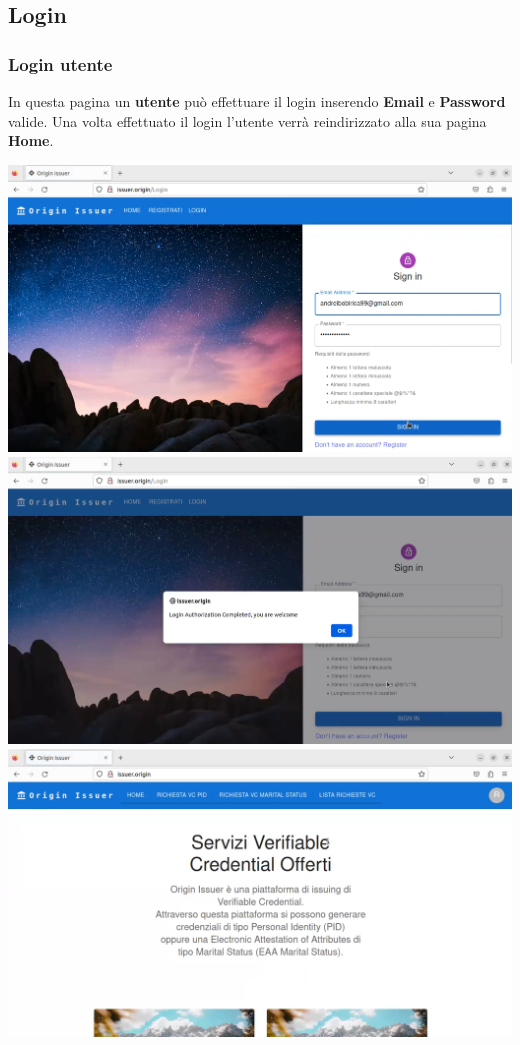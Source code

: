 \subsection{Login}
\subsubsection{Login utente}
In questa pagina un \textbf{utente} può effettuare il login inserendo \textbf{Email} e \textbf{Password} valide. Una volta effettuato il login l'utente verrà reindirizzato alla sua pagina \textbf{Home}.
\begin{center}
    \includegraphics[scale = 0.2]{./res/img/issuer/new/login1.png}
    \includegraphics[scale = 0.2]{./res/img/issuer/new/login2.png}
    \includegraphics[scale = 0.2]{./res/img/issuer/new/login3.png}
\end{center}



